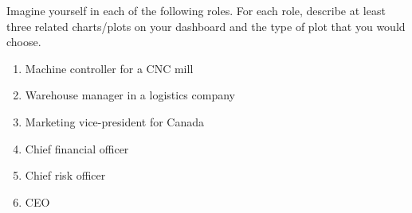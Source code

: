 \begin{exerciseboxpaper}
Imagine yourself in each of the following roles. For each role, describe at least three related charts/plots on your dashboard and the type of plot that you would choose. 

\begin{enumerate}
\item Machine controller for a CNC mill
\item Warehouse manager in a logistics company
\item Marketing vice-president for Canada
\item Chief financial officer
\item Chief risk officer
\item CEO
\end{enumerate}
\end{exerciseboxpaper}


